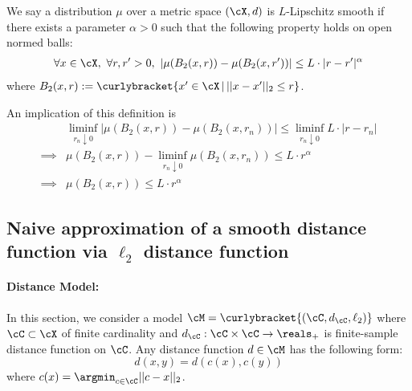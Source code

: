 \begin{definition}\label{def: lipschitz} We say a distribution $\mu$ over a metric space $(\cX,d)$ is $L$-Lipschitz smooth if there exists a parameter $\alpha > 0$ such that the following property holds on open normed balls:
\begin{align*}
    \forall x \in \cX,\,\, \forall r,r' > 0, \,\, |\mu(B_2(x,r)) - \mu(B_2(x,r'))| \le L \cdot |r - r'|^{\alpha}
\end{align*}
where $B_2(x,r) := \curlybracket{x' \in \cX\,|\, ||x - x'||_2 \le r}$.
\end{definition}
An implication of this definition is
\begin{align}
    &\liminf_{r_n \downarrow 0} |\mu(B_2(x,r)) - \mu(B_2(x,r_n))| \le \liminf_{r_n \downarrow 0} L \cdot |r - r_n| \nonumber\\
    \implies & \mu(B_2(x,r)) - \liminf_{r_n \downarrow 0} \mu(B_2(x,r_n)) \le L\cdot r^\alpha \nonumber\\
    \implies & \mu(B_2(x,r)) \le L\cdot r^\alpha \label{eq: rbound}
\end{align}

\subsection{Naive approximation of a smooth distance function via $\ell_2$ distance function}
\paragraph{Distance Model:} In this section, we consider a model $\cM = \curlybracket{(\cC, d_{\cC}, \ell_2)}$ where $\cC \subset \cX$ of finite cardinality and $d_{\cC}: \cC \times \cC \to \reals_{+}$ is finite-sample distance function on $\cC$. Any distance function $d \in \cM$ has the following form:
\begin{equation*}
    d(x,y) = d(c(x), c(y)) 
\end{equation*}
where $c(x) = \argmin_{c \in \cC} ||c - x||_2$.

